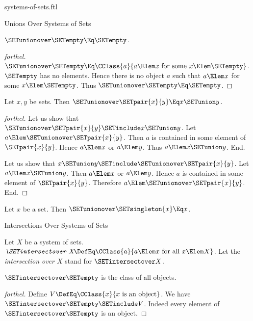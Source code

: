 \documentclass{stex}
\begin{document}
\begin{smodule}{systems-of-sets.ftl}
\begin{sfragment}{Unions Over Systems of Sets}
  \begin{proposition}[forthel]
    $\SETunionover \SETempty \Eq \SETempty$.
  \end{proposition}
  \begin{proof}[forthel]
    $\SETunionover \SETempty \Eq \CClass{a}{a \Elem x\text{ for some }x \Elem \SETempty}$.
    $\SETempty$ has no elements.
    Hence there is no object $a$ such that $a \Elem x$ for some $x \Elem \SETempty$.
    Thus $\SETunionover \SETempty \Eq \SETempty$.
  \end{proof}

  \begin{proposition}[forthel]
    Let $x, y$ be sets.
    Then $\SETunionover \SETpair{x}{y} \Eq x \SETunion y$.
  \end{proposition}
  \begin{proof}[forthel]
    Let us show that $\SETunionover \SETpair{x}{y} \SETinclude x \SETunion y$.
      Let $a \Elem \SETunionover \SETpair{x}{y}$.
      Then $a$ is contained in some element of $\SETpair{x}{y}$.
      Hence $a \Elem x$ or $a \Elem y$.
      Thus $a \Elem x \SETunion y$.
    End.

    Let us show that $x \SETunion y \SETinclude \SETunionover \SETpair{x}{y}$.
      Let $a \Elem x \SETunion y$.
      Then $a \Elem x$ or $a \Elem y$.
      Hence $a$ is contained in some element of $\SETpair{x}{y}$.
      Therefore $a \Elem \SETunionover \SETpair{x}{y}$.
    End.
  \end{proof}

  \begin{corollary}[forthel]
    Let $x$ be a set.
    Then $\SETunionover \SETsingleton{x} \Eq x$.
  \end{corollary}
\end{sfragment}

\begin{sfragment}{Intersections Over Systems of Sets}
  \begin{definition}[forthel,for=intersection over]
    Let $X$ be a system of sets.
    $\emph{\SETintersectover X} \DefEq \CClass{a}{a \Elem x\text{ for all }x \Elem X}$.
    Let the \emph{intersection over $X$} stand for $\SETintersectover X$.
  \end{definition}

  \begin{proposition}[forthel]
    $\SETintersectover \SETempty$ is the class of all objects.
  \end{proposition}
  \begin{proof}[forthel]
    Define $V \DefEq \CClass{x}{x\text{ is an object}}$.
    We have $\SETintersectover \SETempty \SETinclude V$.
    Indeed every element of $\SETintersectover \SETempty$ is an object.


\end{proof}
\end{sfragment}
\end{smodule}
\end{document}
